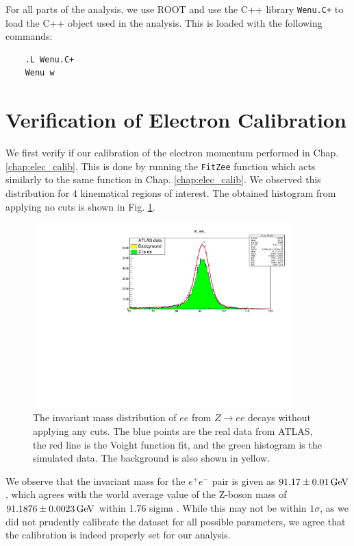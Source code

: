 \documentclass[a4paper]{report}
\numberwithin{equation}{section}
\begin{document}
For all parts of the analysis, we use ROOT and use the C++ library \texttt{Wenu.C+} to load the C++ object used in the analysis. 
This is loaded with the following commands:
\begin{verbatim}
    .L Wenu.C+ 
    Wenu w
\end{verbatim} 


\section{Verification of Electron Calibration}

We first verify if our calibration of the electron momentum performed in Chap. \ref{chap:elec_calib}. This is done by 
running the \texttt{FitZee} function which acts similarly to the same function in Chap. \ref{chap:elec_calib}. We observed 
this distribution for 4 kinematical regions of interest. The obtained histogram from applying no cuts is shown in Fig. \ref{fig:zee_calib}. 

\begin{figure}[htpb]
    \centering
    \includegraphics[width=0.9\textwidth]{zeefit.pdf}
    \caption{The invariant mass distribution of $ee$ from $Z \rightarrow ee$ decays without applying any cuts. The blue points are the 
    real data from ATLAS, the red line is the Voight function fit, and the green histogram is the simulated data. The background 
    is also shown in yellow.}
    \label{fig:zee_calib}
\end{figure}

We observe that the invariant mass for the $e^+ e^-$ pair is given as $\SI{91.17 \pm 0.01}{\giga\electronvolt}$, which agrees with the 
world average value of the Z-boson mass of $\SI{91.1876 \pm 0.0023}{\giga\electronvolt}$ within 1.76 sigma \cite{ParticleDataGroup:2020ssz}.
While this may not be within $1\sigma$, as we did not prudently calibrate the dataset for all possible parameters, we agree that the 
calibration is indeed properly set for our analysis. \par 
\end{document}
